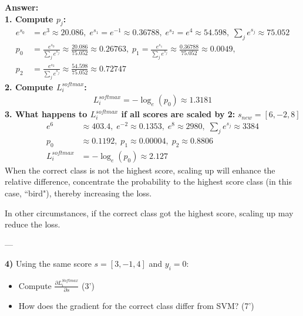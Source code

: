 \documentclass[12pt,a4paper]{article}
\begin{document}
	\textbf{Answer:}\\
	\textbf{1. Compute $p_j$:}
	\begin{align}
		e^{s_0}&=e^3 \approx 20.086,\; e^{s_1}=e^{-1} \approx 0.36788,\; e^{s_2}=e^4 \approx 54.598,\;\sum_j e^{s_j}\approx 75.052
		\\
		p_0&=\frac{e^{s_0}}{\sum_j e^{s_j}} \approx \frac{20.086}{75.052} \approx 0.26763,\; 
		p_1=\frac{e^{s_1}}{\sum_j e^{s_j}} \approx \frac{0.36788}{75.052} \approx 0.0049,\\
		p_2&=\frac{e^{s_2}}{\sum_j e^{s_j}} \approx \frac{54.598}{75.052} \approx 0.72747
	\end{align}
	\textbf{2. Compute $L_i^{softmax}$:}
	\begin{align}
		L_i^{softmax}= -\log_e(p_0)\approx1.3181
	\end{align}
	\textbf{3. What happens to $L_i^{softmax}$ if all scores are scaled by 2:}  $s_{new} = [6,-2,8]$
	\begin{align}
		e^6&\approx403.4,\;e^{-2}\approx0.1353,\;e^8\approx2980,\; \sum_j e^{s_j}\approx 3384
		\\
		p_0&\approx0.1192,\;p_1\approx0.00004,\;p_2\approx0.8806
		\\
		L_i^{softmax}&= -\log_e(p_0)\approx2.127
	\end{align}
	When the correct class is not the highest score, scaling up will enhance the relative difference, concentrate the probability to the highest score class (in this case, ``bird"), thereby increasing the loss.
	
	In other circumstances, if the correct class got the highest score, scaling up may reduce the loss.
	
	---
	
	\textbf{4)}  
	Using the same score $s = [3,-1,4]$ and $y_i = 0$:
	\begin{itemize}[itemsep=0pt, topsep=0pt, parsep=0pt, partopsep=0pt]
		\item Compute $\frac{\partial L_i^{Softmax}}{\partial s}$ (3’)
		\item How does the gradient for the correct class differ from SVM? (7’)
	\end{itemize}
	
\end{document}
